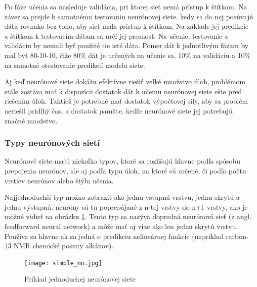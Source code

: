 	Po fáze učenia sa nasleduje validácia, pri ktorej sieť nemá prístup k štítkom. Na záver sa prejde k samotnému testovaniu neurónovej siete, kedy sa do nej posúvajú dáta rovnako bez toho, aby sieť mala prístup k štítkom. Na základe jej predikcie a štítkom k testovacím dátam sa určí jej presnosť. Na učenie, testovanie a validáciu by nemali byť použité tie isté dáta. Pomer dát k jednotlivým fázam by mal byť 80-10-10\cite{80-10-10}, čiže 80\% dát je určených na učenie sa, 10\% na validáciu a 10\% na samotné otestovanie predikcií modelu siete. 
	
	Aj keď neurónové siete dokážu efektívne riešiť veľké množstvo úloh, problémom stále zostáva mať k dispozícii dostatok dát k učeniu neurónovej siete ešte pred riešením úloh. Taktiež je potrebné mať dostatok výpočtovej sily, aby sa problém neriešil pridlhý čas, a dostatok pamäte, keďže neurónové siete jej potrebujú značné množstvo. 
	
\subsubsection{Typy neurónových sietí}

	Neurónové siete majú niekoľko typov, ktoré  sa rozlišujú hlavne podľa spôsobu prepojenia neurónov, ale aj podľa typu úloh, na ktoré sú určené, či podľa počtu vrstiev neurónov alebo štýlu učenia. %
	
	
	Najjednoduchší typ možno zobraziť ako jednu vstupnú vrstvu, jednu skrytú a jednu výstupnú, neuróny sú tu poprepájané z n-tej vrstvy do n+1 vrstvy, ako je možné vidieť na obrázku \ref{simple_nn}. Tento typ sa nazýva dopredná neurónová sieť (z angl. feedforward neural network) a môže mať aj viac ako len jednu skrytú vrstvu. Používa sa hlavne ak sa jedná  o predikciu nelineárnej funkcie (napríklad carbon-13 NMR chemické posuny alkánov\cite{feedforward}). 
	\begin{figure}[H]
		\begin{center}\texttt{[image: simple\_nn.jpg]}\end{center}
		\caption[Jednoduchá neurónová sieť]{Príklad jednoduchej neurónovej siete}\label{simple_nn}
	\end{figure}
	
